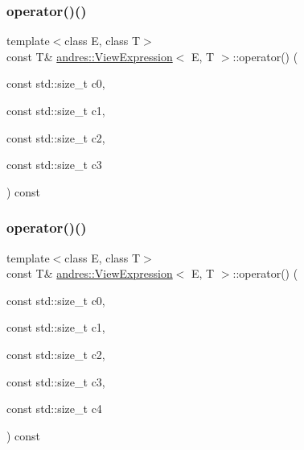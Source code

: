 \subsubsection{\texorpdfstring{operator()()}{operator()()}\hspace{0.1cm}{\footnotesize\ttfamily [4/5]}}
{\footnotesize\ttfamily template$<$class E, class T$>$ \\
const T\& \hyperlink{classandres_1_1ViewExpression}{andres\+::\+View\+Expression}$<$ E, T $>$\+::operator() (\begin{DoxyParamCaption}\item[{const std\+::size\+\_\+t}]{c0,  }\item[{const std\+::size\+\_\+t}]{c1,  }\item[{const std\+::size\+\_\+t}]{c2,  }\item[{const std\+::size\+\_\+t}]{c3 }\end{DoxyParamCaption}) const\hspace{0.3cm}{\ttfamily [inline]}}

\mbox{\label{classandres_1_1ViewExpression_a0aaf6280a5c2b03bc2787a16cc8bd782}} 
\subsubsection{\texorpdfstring{operator()()}{operator()()}\hspace{0.1cm}{\footnotesize\ttfamily [5/5]}}
{\footnotesize\ttfamily template$<$class E, class T$>$ \\
const T\& \hyperlink{classandres_1_1ViewExpression}{andres\+::\+View\+Expression}$<$ E, T $>$\+::operator() (\begin{DoxyParamCaption}\item[{const std\+::size\+\_\+t}]{c0,  }\item[{const std\+::size\+\_\+t}]{c1,  }\item[{const std\+::size\+\_\+t}]{c2,  }\item[{const std\+::size\+\_\+t}]{c3,  }\item[{const std\+::size\+\_\+t}]{c4 }\end{DoxyParamCaption}) const\hspace{0.3cm}{\ttfamily [inline]}}

\mbox{\label{classandres_1_1ViewExpression_aaee8008ec3c5e1c7e4d3cf689215b1fa}} 
